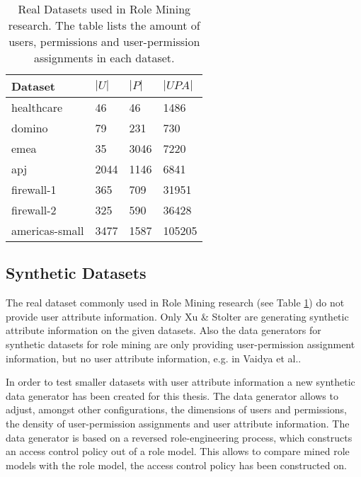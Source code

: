 \begin{table}[H]
    \centering
    \begin{tabular}{|l|l|l|l|}
        \hline
        \rowcolor{myGray} 
        \textbf{Dataset} & \textbf{$|U|$} & \textbf{$|P|$} & \textbf{$|UPA|$} \\ \hline
        healthcare       & 46             & 46                   & 1486                                 \\ \hline
        domino           & 79             & 231                  & 730                                  \\ \hline
        emea             & 35             & 3046                 & 7220                                 \\ \hline
        apj              & 2044           & 1146                 & 6841                                 \\ \hline
        firewall-1       & 365            & 709                  & 31951                                \\ \hline
        firewall-2       & 325            & 590                  & 36428                                \\ \hline
        americas-small   & 3477           & 1587                 & 105205                               \\ \hline
    \end{tabular}
    \caption{Real Datasets used in Role Mining research. The table lists the amount of users, permissions and user-permission assignments in each dataset.}
    \label{tab:realDatasets}
\end{table}

\subsection{Synthetic Datasets}
The real dataset commonly used in Role Mining research (see Table \ref{tab:realDatasets}) do not provide user attribute information. Only Xu \& Stolter\cite{Xu} are generating synthetic attribute information on the given datasets. Also the data generators for synthetic datasets for role mining are only providing user-permission assignment information, but no user attribute information, e.g. in Vaidya et al.\cite{Vaidya:2006:RMR:1180405.1180424}.

In order to test smaller datasets with user attribute information a new synthetic data generator has been created for this thesis. The data generator allows to adjust, amongst other configurations, the dimensions of users and permissions, the density of user-permission assignments and user attribute information. The data generator is based on a reversed role-engineering process, which constructs an access control policy out of a role model. This allows to compare mined role models with the role model, the access control policy has been constructed on.

